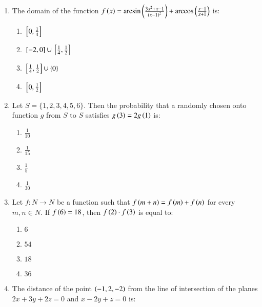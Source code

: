 \documentclass[journal]{IEEEtran}
\begin{document}
\begin{enumerate}
    \item The domain of the function $f\left(x\right)=\arcsin\left(\frac{3x^2+x-1}{\left(x-1\right)^2}\right)+\arccos\left(\frac{x-1}{x+1}\right)$ is:

        \begin{multicols}{4}
            \begin{enumerate}
                \item ${}\left[0, \frac{1}{4}\right]$
                \item ${}\left[-2,0\right]\cup{}\left[\frac{1}{4}, \frac{1}{2}\right]$
                \item ${}\left[\frac{1}{4}, \frac{1}{2}\right]\cup\{0\}$
                \item ${}\left[0, \frac{1}{2}\right]$
            \end{enumerate}
        \end{multicols}

    \item Let $S=\{1,2,3,4,5,6\}$. Then the probability that a randomly chosen onto function $g$ from $S$ to $S$ satisfies $g\left(3\right)=2g\left(1\right)$ is:

		\begin{multicols}{4}
			\begin{enumerate}
				\item $\frac{1}{10}$
				\item $\frac{1}{15}$
				\item $\frac{1}{5}$
				\item $\frac{1}{30}$
			\end{enumerate}
		\end{multicols}

    \item Let $f:N\to N$ be a function such that $f\left(m+n\right)=f\left(m\right)+f\left(n\right)$ for every $m,n\in N$. If $f\left(6\right)=18$, then $f\left(2\right)\cdot f\left(3\right)$ is equal to:

		\begin{multicols}{4}
			\begin{enumerate}
				\item $6$
				\item $54$
				\item $18$
				\item $36$
			\end{enumerate}
		\end{multicols}
  
    \item The distance of the point $\left(-1, 2, -2\right)$ from the line of intersection of the planes $2x+3y+2z=0$ and $x-2y+z=0$ is:


\end{enumerate}
\end{document}

